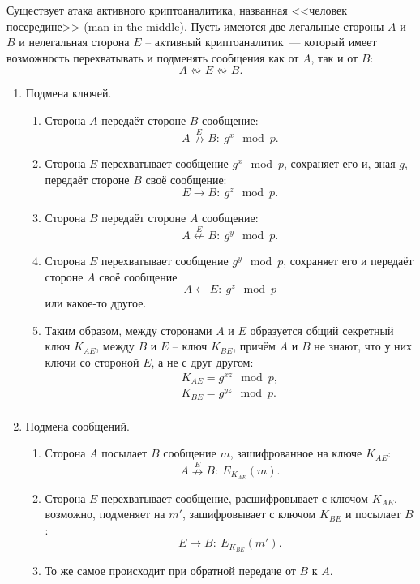Существует атака активного криптоаналитика, названная <<человек посередине>> (man-in-the-middle). Пусть имеются две легальные стороны $A$ и $B$ и нелегальная сторона $E$ -- активный криптоаналитик~--- который имеет возможность перехватывать и подменять сообщения как от $A$, так и от $B$:
    \[ A \leftrightsquigarrow E \leftrightsquigarrow B. \]

\begin{enumerate}
    \item Подмена ключей.
        \begin{enumerate}
            \item Сторона $A$ передаёт стороне $B$ сообщение:
                \[ A \overset{E}{\nrightarrow} B: ~ g^x \mod p. \]
            \item Сторона $E$ перехватывает сообщение $g^x \mod p$, сохраняет его и, зная $g$, передаёт стороне $B$ своё сообщение:
                \[ E \rightarrow B: ~ g^z \mod p. \]
            \item Сторона $B$ передаёт стороне $A$ сообщение:
                \[ A \overset{E}{\nleftarrow} B: ~ g^y \mod p. \]
            \item Сторона $E$ перехватывает сообщение $g^y \mod p$, сохраняет его и передаёт стороне $A$ своё сообщение
                \[ A \leftarrow E: ~ g^z \mod p \]
                или какое-то другое.
            \item Таким образом, между сторонами $A$ и $E$ образуется общий секретный ключ $K_{AE}$, между $B$ и $E$ -- ключ $K_{BE}$, причём $A$ и $B$ не знают, что у них ключи со стороной $E$, а не с друг другом:
                \[ \begin{array} {l}
                    K_{AE} = g^{xz} \mod p, \\
                    K_{BE} = g^{yz} \mod p. \\
                \end{array} \]

        \end{enumerate}
    \item Подмена сообщений.
        \begin{enumerate}
            \item Сторона $A$ посылает $B$ сообщение $m$, зашифрованное на ключе $K_{AE}$:
                \[ A \overset{E}{\nrightarrow} B: ~ E_{K_{AE}}(m). \]
            \item Сторона $E$ перехватывает сообщение, расшифровывает с ключом $K_{AE}$, возможно, подменяет на $m'$, зашифровывает с ключом $K_{BE}$ и посылает $B$:
                \[ E \rightarrow B: ~ E_{K_{BE}}(m'). \]
            \item То же самое происходит при обратной передаче от $B$ к $A$.
        \end{enumerate}
\end{enumerate}

